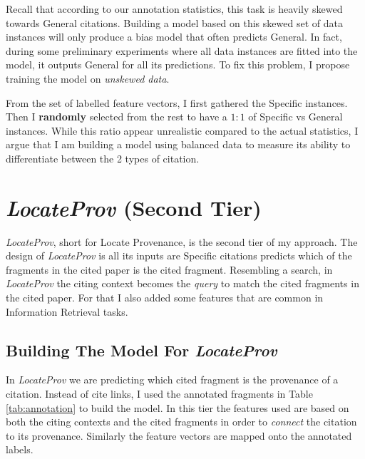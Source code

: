 Recall that according to our annotation statistics, this task is heavily skewed towards General citations. Building a model based on this skewed set of data instances will only produce a bias model that often predicts General. In fact, during some preliminary experiments where all data instances are fitted into the model, it outputs General for all its predictions. To fix this problem, I propose training the model on {\it unskewed data}.

From the set of labelled feature vectors, I first gathered the Specific instances. Then I {\bf randomly} selected from the rest to have a $1:1$ of Specific vs General instances. While this ratio appear unrealistic compared to the actual statistics, I argue that I am building a model using balanced data to measure its ability to differentiate between the 2 types of citation.

\section{{\it LocateProv} (Second Tier)}
\label{secondtier}
{\it LocateProv}, short for Locate Provenance, is the second tier of my approach. The design of {\it LocateProv} is all its inputs are Specific citations predicts which of the fragments in the cited paper is the cited fragment. Resembling a search, in {\it LocateProv} the citing context becomes the {\it query} to match the cited fragments in the cited paper. For that I also added some features that are common in Information Retrieval tasks.

\subsection*{Building The Model For {\it LocateProv}}
In {\it LocateProv} we are predicting which cited fragment is the provenance of a citation. Instead of cite links, I used the annotated fragments in Table \ref{tab:annotation} to build the model. In this tier the features used are based on both the citing contexts and the cited fragments in order to {\it connect} the citation to its provenance. Similarly the feature vectors are mapped onto the annotated labels.

